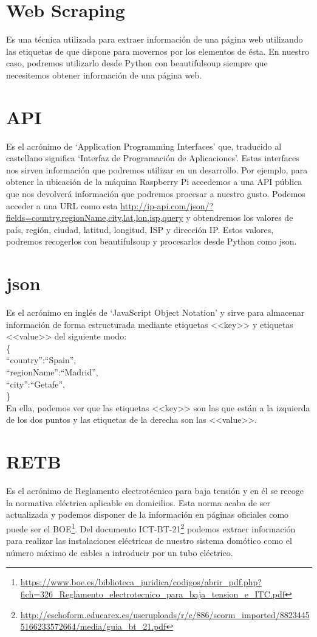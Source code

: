 \section{Web Scraping}
Es una técnica utilizada para extraer información de una página web utilizando las etiquetas de que dispone para movernos por los elementos de ésta.
En nuestro caso, podremos utilizarlo desde Python con beautifulsoup siempre que necesitemos obtener información de una página web.

\section{API}
Es el acrónimo de ‘Application Programming Interfaces’ que, traducido al castellano significa ‘Interfaz de Programación de Aplicaciones’. Estas interfaces nos sirven información que podremos utilizar en un desarrollo.
Por ejemplo, para obtener la ubicación de la máquina Raspberry Pi accedemos a una API pública que nos devolverá información que podremos procesar a nuestro gusto.
Podemos acceder a una URL como esta  \url{http://ip-api.com/json/?fields=country,regionName,city,lat,lon,isp,query} y obtendremos los valores de país, región, ciudad, latitud, longitud, ISP y dirección IP.
Estos valores, podremos recogerlos con beautifulsoup y procesarlos desde Python como json.

\section{json}
Es el acrónimo en inglés de ‘JavaScript Object Notation’ y sirve para almacenar información de forma estructurada mediante etiquetas <<key>> y etiquetas <<value>> del siguiente modo: \\
\{\\``country'':``Spain'',\\ ``regionName'':``Madrid'',\\ ``city'':``Getafe'',\\\}\\
En ella, podemos ver que las etiquetas <<key>> son las que están a la izquierda de los dos puntos y las etiquetas de la derecha son las <<value>>.

\section{RETB}
Es el acrónimo de Reglamento electrotécnico para baja tensión y en él se recoge la normativa eléctrica aplicable en domicilios.
Esta norma acaba de ser actualizada y podemos disponer de la información en páginas oficiales como puede ser el BOE\footnote{\url{https://www.boe.es/biblioteca_juridica/codigos/abrir_pdf.php?fich=326_Reglamento_electrotecnico_para_baja_tension_e_ITC.pdf}}.
Del documento ICT-BT-21\footnote{\url{http://eschoform.educarex.es/useruploads/r/c/886/scorm_imported/88234455166233572664/media/guia_bt_21.pdf}} podemos extraer información para realizar las instalaciones eléctricas de nuestro sistema domótico como el número máximo de cables a introducir por un tubo eléctrico.


